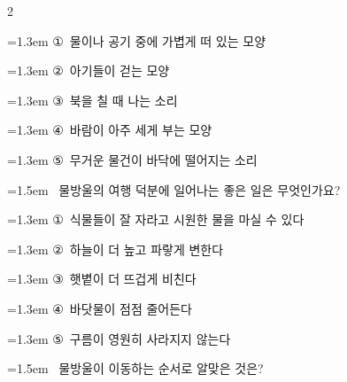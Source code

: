 \documentclass[12pt, a4paper]{article}
\begin{document}
\begin{multicols}{2}
\begin{minipage}{\columnwidth}
\vspace{0.5mm}
{\hangindent=1.3em  \noindent\hspace{0.3em}①~물이나 공기 중에 가볍게 떠 있는 모양\par}
{\hangindent=1.3em  \noindent\hspace{0.3em}②~아기들이 걷는 모양\par}
{\hangindent=1.3em  \noindent\hspace{0.3em}③~북을 칠 때 나는 소리\par}
{\hangindent=1.3em  \noindent\hspace{0.3em}④~바람이 아주 세게 부는 모양\par}
{\hangindent=1.3em  \noindent\hspace{0.3em}⑤~무거운 물건이 바닥에 떨어지는 소리\par}
\vspace{4mm}
\end{minipage}
\par

\noindent\begin{minipage}{\columnwidth}
\vspace{2mm}
{\hangindent=1.5em  ~물방울의 여행 덕분에 일어나는 좋은 일은 무엇인가요?\par}

\vspace{0.5mm}
{\hangindent=1.3em  \noindent\hspace{0.3em}①~식물들이 잘 자라고 시원한 물을 마실 수 있다\par}
{\hangindent=1.3em  \noindent\hspace{0.3em}②~하늘이 더 높고 파랗게 변한다\par}
{\hangindent=1.3em  \noindent\hspace{0.3em}③~햇볕이 더 뜨겁게 비친다\par}
{\hangindent=1.3em  \noindent\hspace{0.3em}④~바닷물이 점점 줄어든다\par}
{\hangindent=1.3em  \noindent\hspace{0.3em}⑤~구름이 영원히 사라지지 않는다\par}
\vspace{4mm}
\end{minipage}
\par

\noindent\begin{minipage}{\columnwidth}
\vspace{2mm}
{\hangindent=1.5em  ~물방울이 이동하는 순서로 알맞은 것은?\par}


\end{minipage}
\end{multicols}
\end{document}
